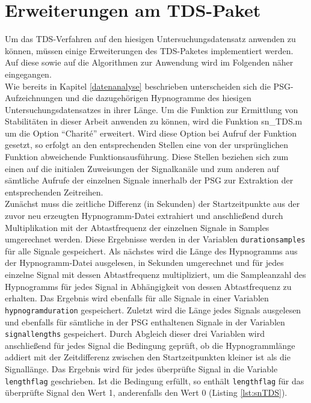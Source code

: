 \section{Erweiterungen am TDS-Paket}\label{erweiterungTDS}

Um das \acs{TDS}-Verfahren auf den hiesigen Untersuchungsdatensatz anwenden zu können, müssen einige Erweiterungen des \acs{TDS}-Paketes implementiert werden. Auf diese sowie auf die Algorithmen zur Anwendung wird im Folgenden näher eingegangen.\\

Wie bereits in Kapitel \ref{datenanalyse} beschrieben unterscheiden sich die \acs{PSG}-Aufzeichnungen und die dazugehörigen Hypnogramme des hiesigen Untersuchungsdatensatzes in ihrer Länge. Um die Funktion zur Ermittlung von Stabilitäten in dieser Arbeit anwenden zu können, wird die Funktion sn\_TDS.m um die Option "`Charit\'{e}"' erweitert. Wird diese Option bei Aufruf der Funktion gesetzt, so erfolgt an den entsprechenden Stellen eine von der ursprünglichen Funktion abweichende Funktionsausführung. Diese Stellen beziehen sich zum einen auf die initialen Zuweisungen der Signalkanäle und zum anderen auf sämtliche Aufrufe der einzelnen Signale innerhalb der \acs{PSG} zur Extraktion der entsprechenden Zeitreihen.\\

Zunächst muss die zeitliche Differenz (in Sekunden) der Startzeitpunkte aus der zuvor neu erzeugten Hypnogramm-Datei extrahiert und anschließend durch Multiplikation mit der Abtastfrequenz der einzelnen Signale in Samples umgerechnet werden. Diese Ergebnisse werden in der Variablen \texttt{durationsamples} für alle Signale gespeichert. Als nächstes wird die Länge des Hypnogramms aus der Hypnogramm-Datei ausgelesen, in Sekunden umgerechnet und für jedes einzelne Signal mit dessen Abtastfrequenz multipliziert, um die Sampleanzahl des Hypnogramms für jedes Signal in Abhängigkeit von dessen Abtastfrequenz zu erhalten. Das Ergebnis wird ebenfalls für alle Signale in einer Variablen \texttt{hypnogramduration} gespeichert. Zuletzt wird die Länge jedes Signals ausgelesen und ebenfalls für sämtliche in der \acs{PSG} enthaltenen Signale in der Variablen \texttt{signallengths} gespeichert. Durch Abgleich dieser drei Variablen wird anschließend für jedes Signal die Bedingung geprüft, ob die Hypnogrammlänge addiert mit der Zeitdifferenz zwischen den Startzeitpunkten kleiner ist als die Signallänge. Das Ergebnis wird für jedes überprüfte Signal in die Variable \texttt{lengthflag} geschrieben. Ist die Bedingung erfüllt, so enthält \texttt{lengthflag} für das überprüfte Signal den Wert 1, anderenfalls den Wert 0 (Listing \ref{lst:snTDS}).\\

